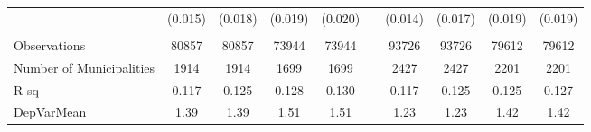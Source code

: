 \begin{tabular}{lccccccccc}
      & (0.015) & (0.018) & (0.019) & (0.020) &       & (0.014) & (0.017) & (0.019) & (0.019) \\
      &       &       &       &       &       &       &       &       &  \\
\midrule
Observations & 80857 & 80857 & 73944 & 73944 &       & 93726 & 93726 & 79612 & 79612 \\
Number of Municipalities & 1914  & 1914  & 1699  & 1699  &       & 2427  & 2427  & 2201  & 2201 \\
R-sq  & 0.117 & 0.125 & 0.128 & 0.130 &       & 0.117 & 0.125 & 0.125 & 0.127 \\
DepVarMean & 1.39  & 1.39  & 1.51  & 1.51  &       & 1.23  & 1.23  & 1.42  & 1.42 \\
\bottomrule
\bottomrule
\end{tabular}%
